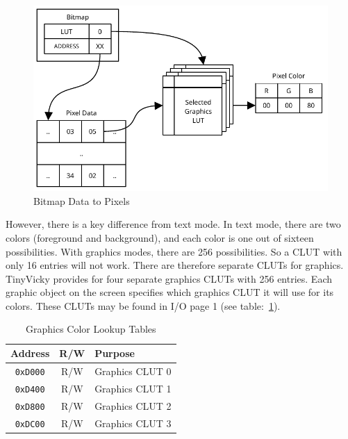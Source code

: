 \begin{figure}[ht]
    \begin{center}
        \includegraphics{images/bitmaps.pdf}
    \end{center}
    \caption{Bitmap Data to Pixels}
    \label{fig:bitmap_colors}
\end{figure}

However, there is a key difference from text mode. In text mode, there are two colors (foreground and background), and each color is one out of sixteen possibilities. With graphics modes, there are 256 possibilities. So a CLUT with only 16 entries will not work. There are therefore separate CLUTs for graphics. TinyVicky provides for four separate graphics CLUTs with 256 entries. Each graphic object on the screen specifies which graphics CLUT it will use for its colors. These CLUTs may be found in I/O page 1 (see table:~\ref{tab:graph_cluts}).

\begin{table}[ht]
    \begin{center}
        \begin{tabular}{|c|c|l|} \hline
            Address & R/W & Purpose \\\hline\hline
            \verb+0xD000+ & R/W & Graphics CLUT 0 \\ \hline
            \verb+0xD400+ & R/W & Graphics CLUT 1 \\ \hline
            \verb+0xD800+ & R/W & Graphics CLUT 2 \\ \hline
            \verb+0xDC00+ & R/W & Graphics CLUT 3 \\ \hline
        \end{tabular}
    \end{center}
    \caption{Graphics Color Lookup Tables}
    \label{tab:graph_cluts}
\end{table}

